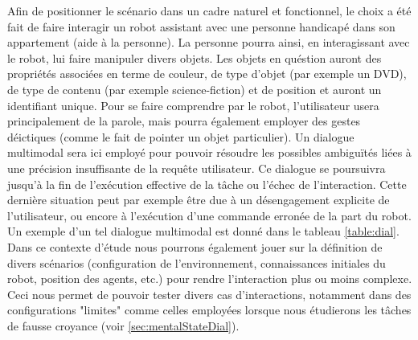 \documentclass[a4paper,11pt,twoside]{StyleThese}
\begin{document}
Afin de positionner le scénario dans un cadre naturel et fonctionnel, le choix a été
fait de faire interagir un robot assistant avec une personne handicapé dans son appartement (aide
à la personne). La personne pourra ainsi, en interagissant avec le robot, lui faire manipuler divers objets. Les objets en quéstion auront des propriétés associées en terme de couleur, de type d'objet (par exemple un DVD), de type de contenu (par exemple science-fiction) et de position et auront un identifiant unique. Pour se faire comprendre
par le robot, l’utilisateur usera principalement de la parole, mais pourra également employer des gestes déictiques (comme le fait de pointer un objet particulier).
Un dialogue multimodal sera ici employé pour pouvoir résoudre les possibles ambiguïtés liées à une précision insuffisante de la requête utilisateur.
Ce dialogue se poursuivra jusqu’à la fin de l’exécution effective de la tâche ou
l’échec de l’interaction. Cette dernière situation peut par exemple être due à un désengagement explicite de l’utilisateur, ou encore à l’exécution d’une commande erronée
de la part du robot. Un exemple d’un tel dialogue multimodal est donné dans le tableau \ref{table:dial}.
Dans ce contexte d’étude nous pourrons également jouer sur la définition de divers
scénarios (configuration de l’environnement, connaissances initiales du robot, position
des agents, etc.) pour rendre l’interaction plus ou moins complexe. Ceci nous permet de
pouvoir tester divers cas d’interactions, notamment dans des configurations "limites" comme celles employées lorsque nous étudierons les tâches de fausse croyance (voir \ref{sec:mentalStateDial}).
\end{document}

